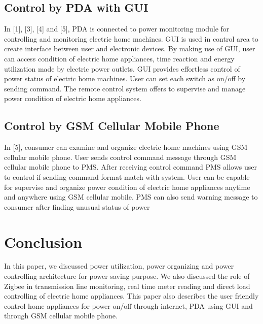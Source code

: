 \documentclass[10pt, conference, compsocconf]{IEEEtran}
\begin{document}
\subsection{Control by PDA with GUI}
In [1], [3], [4] and [5], PDA is connected to power monitoring module for controlling and monitoring electric home machines. GUI is used in control area to create interface between user and electronic devices. By making use of GUI, user can access condition of electric home appliances, time reaction and energy utilization made by electric power outlets. GUI provides effortless control of power status of electric home machines. User can set each switch as on/off by sending command. The remote control system offers to supervise and manage power condition of electric home appliances.

\subsection{Control by GSM Cellular Mobile Phone}
In [5], consumer can examine and organize electric home machines using GSM cellular mobile phone. User sends control command message through GSM cellular mobile phone to PMS. After receiving control command PMS allows user to control if sending command format match with system. User can be capable for supervise and organize power condition of electric home appliances anytime and anywhere using GSM cellular mobile. PMS can also send warning message to consumer after finding unusual status of power

\section{Conclusion}
In this paper, we discussed power utilization, power organizing and power controlling architecture for power saving purpose. We also discussed the role of Zigbee in transmission line monitoring, real time meter reading and direct load controlling of electric home appliances. This paper also describes the user friendly control home appliances for power on/off through internet, PDA using GUI and through GSM cellular mobile phone.
\end{document}
